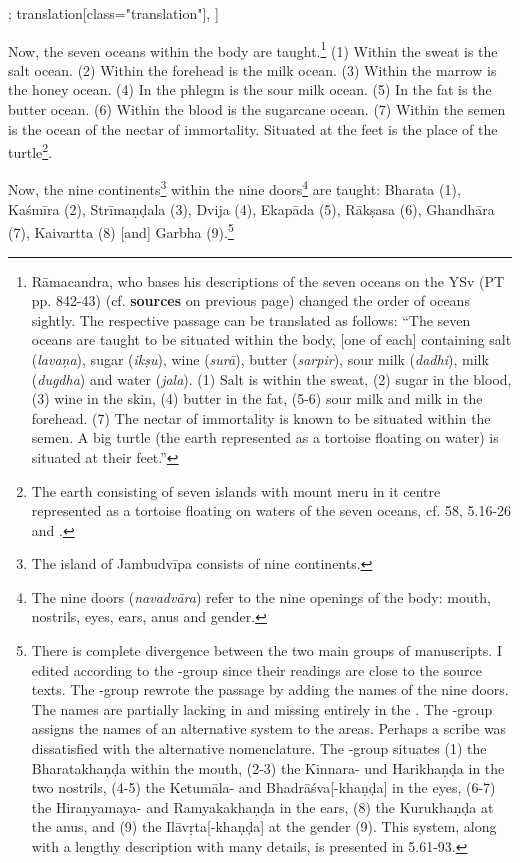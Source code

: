 \begin{alignment}[
  texts=edition[class="edition"];
  translation[class="translation"],
  ]
\begin{translation}
\begin{tlate}[p37_01]
Now, the seven oceans within the body are taught.\footnote{Rāmacandra, who bases his descriptions of the seven oceans on the YSv (PT pp. 842-43) (cf. \textbf{sources} on previous page) changed the order of oceans sightly. The respective passage can be translated as follows: ``The seven oceans are taught to be situated within the body, [one of each] containing salt (\textit{lavaṇa}), sugar (\textit{ikṣu}), wine (\textit{surā}), butter (\textit{sarpir}), sour milk (\textit{dadhi}), milk (\textit{dugdha}) and water (\textit{jala}). (1) Salt is within the sweat, (2) sugar in the blood, (3) wine in the skin, (4) butter in the fat, (5-6) sour milk and milk in the forehead. (7) The nectar of immortality is known to be situated within the semen. A big turtle (the earth represented as a tortoise floating on water) is situated at their feet.''} (1) Within the sweat is the salt ocean. (2) Within the forehead is the milk ocean. (3) Within the marrow is the honey ocean. (4) In the phlegm is the sour milk ocean. (5) In the fat is the butter ocean. (6) Within the blood is the sugarcane ocean. (7) Within the semen is the ocean of the nectar of immortality. Situated at the feet is the place of the turtle\footnote{The earth consisting of seven islands with mount meru in it centre represented as a tortoise floating on waters of the seven oceans, cf.  58,  5.16-26 and \citeauthor[2009:354]{bryant2009}.}.
\end{tlate}
\begin{tlate}[p38_01]
  Now, the nine continents\footnote{The island of Jambudvīpa consists of nine continents.} within the nine doors\footnote{The nine doors (\textit{navadvāra}) refer to the nine openings of the body: mouth, nostrils, eyes, ears, anus and gender.} are taught: Bharata (1), Kaśmīra (2), Strīmaṇḍala (3), Dvija (4), Ekapāda (5), Rākṣasa (6), Ghandhāra (7), Kaivartta (8) [and] Garbha (9).\footnote{There is complete divergence between the two main groups of manuscripts. I edited according to the \alpha-group since their readings are close to the source texts. The \beta-group rewrote the passage by adding the names of the nine doors. The names are partially lacking in  and missing entirely in the . The \beta-group assigns the names of an alternative system to the areas. Perhaps a scribe was dissatisfied with the alternative nomenclature. The \beta-group situates (1) the Bharatakhaṇḍa within the mouth, (2-3) the Kinnara- und Harikhaṇḍa in the two nostrils, (4-5) the Ketumāla- and Bhadrāśva[-khaṇḍa] in the eyes, (6-7) the Hiraṇyamaya- and Ramyakakhaṇḍa in the ears, (8) the Kurukhaṇḍa at the anus, and (9) the Ilāvṛta[-khaṇḍa] at the gender (9). This system, along with a lengthy description with many details, is presented in  5.61-93.}
  \flushpage
  \end{tlate}
  \end{translation}
\end{alignment}
